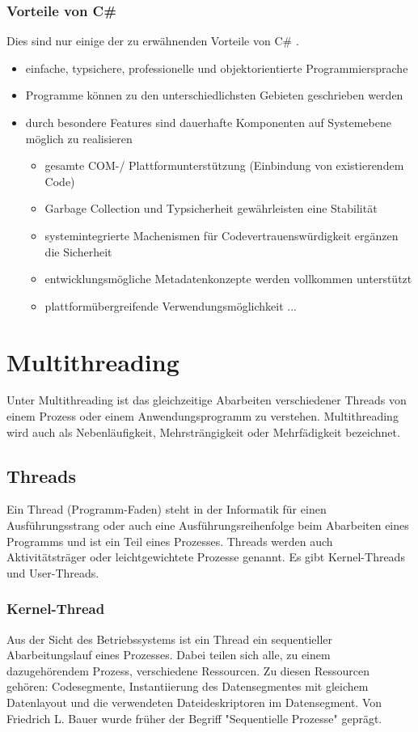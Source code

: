 \documentclass[12pt,a4paper]{report}
\begin{document}
\begin{onehalfspace}
\subsubsection{Vorteile von C\#}
Dies sind nur einige der zu erwähnenden Vorteile von C\# .
\begin{itemize}
\item einfache, typsichere, professionelle und objektorientierte Programmiersprache
\item Programme können zu den unterschiedlichsten Gebieten geschrieben werden
\item durch besondere Features sind dauerhafte Komponenten auf Systemebene möglich zu realisieren
\begin{itemize}
\item gesamte COM-/ Plattformunterstützung (Einbindung von existierendem Code)
\item Garbage Collection und Typsicherheit gewährleisten eine Stabilität
\item systemintegrierte Machenismen für Codevertrauenswürdigkeit ergänzen die Sicherheit
\item entwicklungsmögliche Metadatenkonzepte werden vollkommen unterstützt
\item plattformübergreifende Verwendungsmöglichkeit ...
\end{itemize}
\end{itemize}

\section{Multithreading}
Unter Multithreading ist das gleichzeitige Abarbeiten verschiedener Threads von einem Prozess oder einem Anwendungsprogramm zu verstehen. Multithreading wird auch als Nebenläufigkeit, Mehrsträngigkeit oder Mehrfädigkeit bezeichnet.

\subsection{Threads}
Ein Thread (Programm-Faden) steht in der Informatik für einen Ausführungsstrang oder auch eine Ausführungsreihenfolge beim Abarbeiten eines Programms und ist ein Teil eines Prozesses. Threads werden auch Aktivitätsträger oder leichtgewichtete Prozesse genannt. Es gibt Kernel-Threads und User-Threads.

\subsubsection{Kernel-Thread}
Aus der Sicht des Betriebssystems ist ein Thread ein sequentieller Abarbeitungslauf eines Prozesses. Dabei teilen sich alle, zu einem dazugehörendem Prozess, verschiedene Ressourcen. Zu diesen Ressourcen gehören: Codesegmente, Instantiierung des Datensegmentes mit gleichem Datenlayout und die verwendeten Dateideskriptoren im Datensegment. Von Friedrich L. Bauer wurde früher der Begriff "Sequentielle Prozesse" geprägt.\\


\end{onehalfspace}
\end{document}
